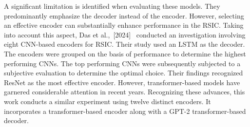 A significant limitation is identified when evaluating these models. They predominantly emphasize the decoder instead of the encoder. However, selecting an effective encoder can substantially enhance performance in the RSIC. Taking into account this aspect, Das et al.,~[2024]~\cite{das2024unveiling} conducted an investigation involving eight CNN-based encoders for RSIC. Their study used an LSTM as the decoder. The encoders were grouped on the basis of performance to determine the highest performing CNNs. The top performing CNNs were subsequently subjected to a subjective evaluation to determine the optimal choice. Their findings recognized ResNet as the most effective encoder. However, transformer-based models have garnered considerable attention in recent years. Recognizing these advances, this work conducts a similar experiment using twelve distinct encoders. It incorporates a transformer-based encoder along with a GPT-2 transformer-based decoder.